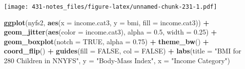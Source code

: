 \documentclass[
]{book}
\newenvironment{Shaded}{\begin{snugshade}}{\end{snugshade}}
\newcommand{\DataTypeTok}[1]{\textcolor[rgb]{0.13,0.29,0.53}{#1}}
\newcommand{\FloatTok}[1]{\textcolor[rgb]{0.00,0.00,0.81}{#1}}
\newcommand{\KeywordTok}[1]{\textcolor[rgb]{0.13,0.29,0.53}{\textbf{#1}}}
\newcommand{\NormalTok}[1]{#1}
\newcommand{\OperatorTok}[1]{\textcolor[rgb]{0.81,0.36,0.00}{\textbf{#1}}}
\newcommand{\OtherTok}[1]{\textcolor[rgb]{0.56,0.35,0.01}{#1}}
\newcommand{\StringTok}[1]{\textcolor[rgb]{0.31,0.60,0.02}{#1}}
\begin{document}
\begin{Shaded}
\end{Shaded}

\texttt{[image: 431-notes\_files/figure-latex/unnamed-chunk-231-1.pdf]}

\begin{Shaded}
\begin{Highlighting}[]
\KeywordTok{ggplot}\NormalTok{(nyfs2, }\KeywordTok{aes}\NormalTok{(}\DataTypeTok{x =}\NormalTok{ income.cat3, }\DataTypeTok{y =}\NormalTok{ bmi, }\DataTypeTok{fill =}\NormalTok{ income.cat3)) }\OperatorTok{+}
\StringTok{  }\KeywordTok{geom_jitter}\NormalTok{(}\KeywordTok{aes}\NormalTok{(}\DataTypeTok{color =}\NormalTok{ income.cat3), }\DataTypeTok{alpha =} \FloatTok{0.5}\NormalTok{, }\DataTypeTok{width =} \FloatTok{0.25}\NormalTok{) }\OperatorTok{+}
\StringTok{  }\KeywordTok{geom_boxplot}\NormalTok{(}\DataTypeTok{notch =} \OtherTok{TRUE}\NormalTok{, }\DataTypeTok{alpha =} \FloatTok{0.75}\NormalTok{) }\OperatorTok{+}
\StringTok{  }\KeywordTok{theme_bw}\NormalTok{() }\OperatorTok{+}
\StringTok{  }\KeywordTok{coord_flip}\NormalTok{() }\OperatorTok{+}
\StringTok{  }\KeywordTok{guides}\NormalTok{(}\DataTypeTok{fill =} \OtherTok{FALSE}\NormalTok{, }\DataTypeTok{col =} \OtherTok{FALSE}\NormalTok{) }\OperatorTok{+}
\StringTok{  }\KeywordTok{labs}\NormalTok{(}\DataTypeTok{title =} \StringTok{"BMI for 280 Children in NNYFS"}\NormalTok{,}
       \DataTypeTok{y =} \StringTok{"Body-Mass Index"}\NormalTok{, }\DataTypeTok{x =} \StringTok{"Income Category"}\NormalTok{)}
\end{Highlighting}
\end{Shaded}
\end{document}
